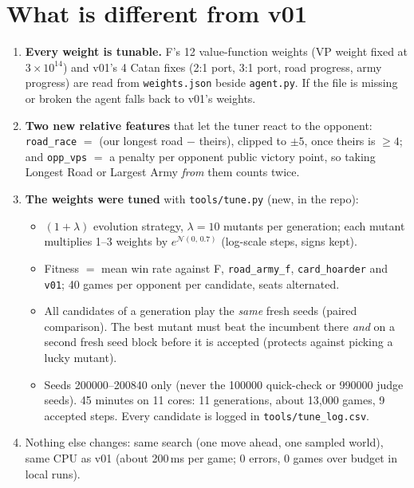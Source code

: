 \documentclass[11pt]{article}
\begin{document}
\section{What is different from v01}
\begin{enumerate}
  \item \textbf{Every weight is tunable.} F's 12 value-function weights (VP weight fixed at
    $3\times10^{14}$) and v01's 4 Catan fixes (2:1 port, 3:1 port, road progress, army progress)
    are read from \texttt{weights.json} beside \texttt{agent.py}. If the file is missing or broken
    the agent falls back to v01's weights.
  \item \textbf{Two new relative features} that let the tuner react to the opponent:
    \texttt{road\_race} $=$ (our longest road $-$ theirs), clipped to $\pm5$, once theirs is
    $\ge 4$; and \texttt{opp\_vps} $=$ a penalty per opponent public victory point, so taking
    Longest Road or Largest Army \emph{from} them counts twice.
  \item \textbf{The weights were tuned} with \texttt{tools/tune.py} (new, in the repo):
    \begin{itemize}
      \item $(1+\lambda)$ evolution strategy, $\lambda=10$ mutants per generation; each mutant
        multiplies 1--3 weights by $e^{\mathcal{N}(0,\,0.7)}$ (log-scale steps, signs kept).
      \item Fitness $=$ mean win rate against F, \texttt{road\_army\_f}, \texttt{card\_hoarder} and
        \texttt{v01}; 40 games per opponent per candidate, seats alternated.
      \item All candidates of a generation play the \emph{same} fresh seeds (paired comparison).
        The best mutant must beat the incumbent there \emph{and} on a second fresh seed block
        before it is accepted (protects against picking a lucky mutant).
      \item Seeds 200000--200840 only (never the 100000 quick-check or 990000 judge seeds).
        45 minutes on 11 cores: 11 generations, about 13{,}000 games, 9 accepted steps.
        Every candidate is logged in \texttt{tools/tune\_log.csv}.
    \end{itemize}
  \item Nothing else changes: same search (one move ahead, one sampled world), same CPU as v01
    (about 200\,ms per game; 0 errors, 0 games over budget in local runs).
\end{enumerate}
\end{document}
